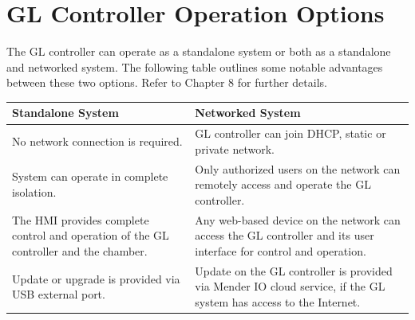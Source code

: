 \section{GL Controller Operation
Options}

The GL controller can operate as a standalone system or both as a
standalone and networked system. The following table outlines some
notable advantages between these two options. Refer to Chapter 8 for
further details.

\begin{longtable}[]{@{}|l|l|@{}}
\toprule
\rowcolor{brown}\begin{minipage}[b]{0.48\columnwidth}\raggedright
{\bf{Standalone System}}\strut
\end{minipage} & \begin{minipage}[b]{0.46\columnwidth}\raggedright
{\bf{Networked System}}\strut
\end{minipage}\tabularnewline
\midrule
\endhead
\begin{minipage}[t]{0.48\columnwidth}\raggedright
No network connection is required.\strut
\end{minipage} & \begin{minipage}[t]{0.46\columnwidth}\raggedright
GL controller can join DHCP, static or private network.\strut
\end{minipage}\tabularnewline
\begin{minipage}[t]{0.48\columnwidth}\raggedright
System can operate in complete isolation.\strut
\end{minipage} & \begin{minipage}[t]{0.46\columnwidth}\raggedright
Only authorized users on the network can remotely access and operate the
GL controller.\strut
\end{minipage}\tabularnewline
\begin{minipage}[t]{0.48\columnwidth}\raggedright
The HMI provides complete control and operation of the GL controller and
the chamber.\strut
\end{minipage} & \begin{minipage}[t]{0.46\columnwidth}\raggedright
Any web-based device on the network can access the GL controller and its
user interface for control and operation.\strut
\end{minipage}\tabularnewline
\begin{minipage}[t]{0.48\columnwidth}\raggedright
Update or upgrade is provided via USB external port.\strut
\end{minipage} & \begin{minipage}[t]{0.46\columnwidth}\raggedright
Update on the GL controller is provided via Mender IO cloud service, if
the GL system has access to the Internet.\strut
\end{minipage}\tabularnewline
\bottomrule
\end{longtable}


